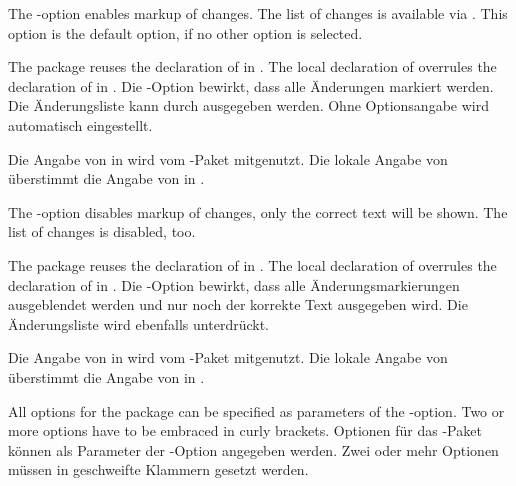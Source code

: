 \ifENGLISH
	The -option enables markup of changes.
	The list of changes is available via .
	This option is the default option, if no other option is selected.

	The  package reuses the declaration of  in .
	The local declaration of  overrules the declaration of  in .
\fi
	\ifGERMAN
		Die -Option bewirkt, dass alle Änderungen markiert werden.
		Die Änderungsliste kann durch  ausgegeben werden.
		Ohne Optionsangabe wird  automatisch eingestellt.

		Die Angabe von  in  wird vom -Paket mitgenutzt.
		Die lokale Angabe von  überstimmt die Angabe von  in .
	\fi


\ifENGLISH
	The -option disables markup of changes, only the correct text will be shown.
	The list of changes is disabled, too.

	The  package reuses the declaration of  in .
	The local declaration of  overrules the declaration of  in .
\fi
	\ifGERMAN
		Die -Option bewirkt, dass alle Änderungsmarkierungen ausgeblendet werden und nur noch der korrekte Text ausgegeben wird.
		Die Änderungsliste wird ebenfalls unterdrückt.

		Die Angabe von  in  wird vom -Paket mitgenutzt.
		Die lokale Angabe von  überstimmt die Angabe von  in .
	\fi


\ifENGLISH
	All options for the  package can be specified as parameters of the -option.
	Two or more options have to be embraced in curly brackets.
\fi
	\ifGERMAN
		Optionen für das -Paket können als Parameter der -Option angegeben werden.
		Zwei oder mehr Optionen müssen in geschweifte Klammern gesetzt werden.
	\fi

\\

